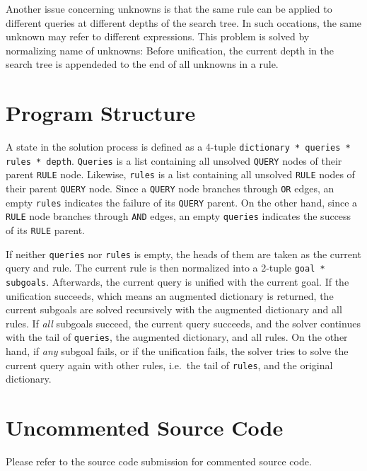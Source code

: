 \documentclass[11pt,a4paper]{article}
\begin{document}
Another issue concerning unknowns is that the same rule can be applied to different queries at different depths of the search tree. In such occations, the same unknown may refer to different expressions. This problem is solved by normalizing name of unknowns: Before unification, the current depth in the search tree is appendeded to the end of all unknowns in a rule.

\section{Program Structure}

A state in the solution process is defined as a 4-tuple \texttt{dictionary * queries * rules * depth}. \texttt{Queries} is a list containing all unsolved \texttt{QUERY} nodes of their parent \texttt{RULE} node. Likewise, \texttt{rules} is a list containing all unsolved \texttt{RULE} nodes of their parent \texttt{QUERY} node. Since a \texttt{QUERY} node branches through \texttt{OR} edges, an empty \texttt{rules} indicates the failure of its \texttt{QUERY} parent. On the other hand, since a \texttt{RULE} node branches through \texttt{AND} edges, an empty \texttt{queries} indicates the success of its \texttt{RULE} parent.

If neither \texttt{queries} nor \texttt{rules} is empty, the heads of them are taken as the current query and rule. The current rule is then normalized into a 2-tuple \texttt{goal * subgoals}. Afterwards, the current query is unified with the current goal. If the unification succeeds, which means an augmented dictionary is returned, the current subgoals are solved recursively with the augmented dictionary and all rules. If \emph{all} subgoals succeed, the current query succeeds, and the solver continues with the tail of \texttt{queries}, the augmented dictionary, and all rules. On the other hand, if \emph{any} subgoal fails, or if the unification fails, the solver tries to solve the current query again with other rules, i.e.\ the tail of \texttt{rules}, and the original dictionary.

\newpage

\appendix

\section{Uncommented Source Code}

Please refer to the source code submission for commented source code.
\end{document}
